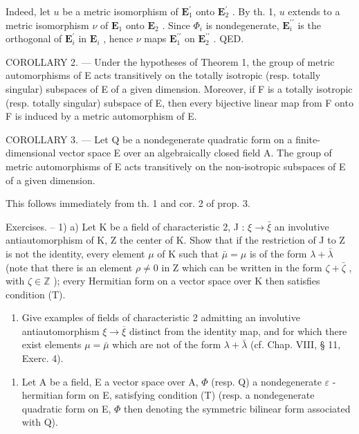 Indeed, let \(u\) be a metric isomorphism of \(\mathbf{E}_{1}^{\prime}\) onto \(\mathbf{E}_{2}^{\prime}\) . By th. 1, \(u\) extends to a metric isomorphism \(\nu\) of \(\mathbf{E}_{1}\) onto \(\mathbf{E}_{2}\) . Since \(\Phi_{i}\) is nondegenerate, \(\mathbf{E}_{i}^{\prime\prime}\) is the orthogonal of \(\mathbf{E}_{i}^{\prime}\) in \(\mathbf{E}_{i}\) , hence \(\nu\) maps \(\mathbf{E}_{1}^{\prime\prime}\) on \(\mathbf{E}_{2}^{\prime\prime}\) . QED.

COROLLARY 2. --- Under the hypotheses of Theorem 1, the group of metric automorphisms of E acts transitively on the totally isotropic (resp. totally singular) subspaces of E of a given dimension. Moreover, if F is a totally isotropic (resp. totally singular) subspace of E, then every bijective linear map from F onto F is induced by a metric automorphism of E.

COROLLARY 3. --- Let Q be a nondegenerate quadratic form on a finite-dimensional vector space E over an algebraically closed field A. The group of metric automorphisms of E acts transitively on the non-isotropic subspaces of E of a given dimension.

This follows immediately from th. 1 and cor. 2 of prop. 3.

Exercises. -- 1) a) Let K be a field of characteristic 2, J : \(\xi \to \bar{\xi}\) an involutive antiautomorphism of K, Z the center of K. Show that if the restriction of J to Z is not the identity, every element \(\mu\) of K such that \(\bar{\mu} = \mu\) is of the form \(\lambda + \bar{\lambda}\) (note that there is an element \(\rho \neq 0\) in Z which can be written in the form \(\zeta + \bar{\zeta}\) , with \(\zeta \in \mathbb{Z}\) ); every Hermitian form on a vector space over K then satisfies condition (T).

\begin{enumerate}
\def\labelenumi{\alph{enumi})}
\setcounter{enumi}{1}
\tightlist
\item
  Give examples of fields of characteristic 2 admitting an involutive antiautomorphism \(\xi \to \overline{\xi}\) distinct from the identity map, and for which there exist elements \(\mu = \bar{\mu}\) which are not of the form \(\lambda + \bar{\lambda}\) (cf. Chap. VIII, § 11, Exerc. 4).
\end{enumerate}

\begin{enumerate}
\def\labelenumi{\arabic{enumi})}
\setcounter{enumi}{1}
\tightlist
\item
  Let A be a field, E a vector space over A, \(\Phi\) (resp. Q) a nondegenerate \(\varepsilon\) -hermitian form on E, satisfying condition (T) (resp. a nondegenerate quadratic form on E, \(\Phi\) then denoting the symmetric bilinear form associated with Q).
\end{enumerate}

